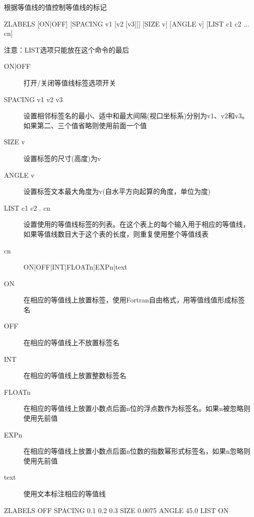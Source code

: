\label{cmd:zlabels}

根据等值线的值控制等值线的标记

\begin{SACSTX}
ZLABELS [ON|OFF] [SPACING v1 [v2 [v3]]] [SIZE v]
    [ANGLE v] [LIST c1 c2 ... cn]
\end{SACSTX}
注意：LIST选项只能放在这个命令的最后

\begin{description}
\item [ON|OFF] 打开/关闭等值线标签选项开关
\item [SPACING v1 v2 v3] 设置相邻标签名的最小、适中和最大间隔(视口坐标系)分别为v1、v2和v3。如果第二、三个值省略则使用前面一个值
\item [SIZE v] 设置标签的尺寸(高度)为v
\item [ANGLE v] 设置标签文本最大角度为v(自水平方向起算的角度，单位为度)
\item [LIST c1 c2 . cn] 设置使用的等值线标签的列表。在这个表上的每个输入用于相应的等值线，如果等值线数目大于这个表的长度，则重复使用整个等值线表
\item [cn]  ON|OFF|INT|FLOATn|EXPn|text
\item [ON] 在相应的等值线上放置标签，使用Fortran自由格式，用等值线值形成标签名
\item [OFF] 在相应的等值线上不放置标签名
\item [INT] 在相应的等值线上放置整数标签名
\item [FLOATn] 在相应的等值线上放置小数点后面n位的浮点数作为标签名。如果n被忽略则使用先前值
\item [EXPn] 在相应的等值线上放置小数点后面n位数的指数幂形式标签名，如果n忽略则使用先前值
\item [text] 使用文本标注相应的等值线
\end{description}

\begin{SACDFT}
ZLABELS OFF SPACING 0.1 0.2 0.3 SIZE 0.0075 ANGLE 45.0 LIST ON
\end{SACDFT}
